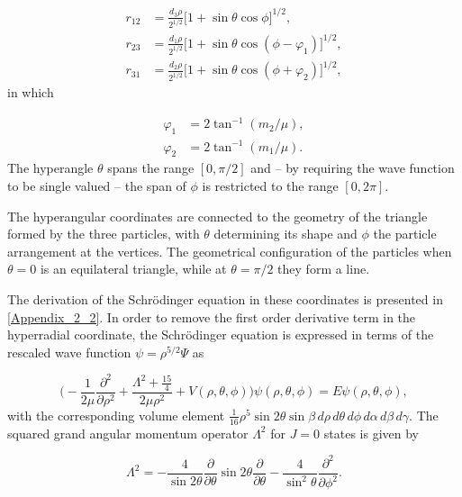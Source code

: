 \begin{equation}
\begin{aligned}
r_{12} &= \frac{d_3\rho}{2^{1/2}}\big[1+\sin\theta\cos\phi\big]^{1/2},\\
r_{23} &= \frac{d_1\rho}{2^{1/2}}\big[1 + \sin\theta\cos(\phi-\varphi_1)\big]^{1/2},\\
r_{31} &= \frac{d_2\rho}{2^{1/2}}\big[1 + \sin\theta\cos(\phi + \varphi_2)\big]^{1/2},
\end{aligned}
\end{equation}
in which

\begin{equation}
\begin{aligned}
\varphi_1 &= 2\tan^{-1}(m_2/\mu),\\
\varphi_2 &= 2\tan^{-1}(m_1/\mu).
\end{aligned}
\end{equation}
The hyperangle $\theta$ spans the range $[0,\pi/2]$ and -- by requiring the wave function to be single valued -- the span of $\phi$ is restricted to the range $[0,2\pi]$. 

The hyperangular coordinates are connected to the geometry of the triangle formed by the three particles, with $\theta$ determining its shape and $\phi$ the particle arrangement at the vertices. The geometrical configuration of the particles when $\theta = 0$ is an equilateral triangle, while at $\theta=\pi/2$ they form a line. 

The derivation of the Schr{\"o}dinger equation in these coordinates is presented in \cref{Appendix_2_2}. In order to remove the first order derivative term in the hyperradial coordinate, the Schr{\"o}dinger equation is expressed in terms of the rescaled wave function $\psi = \rho^{5/2}\Psi$ as

\begin{equation}
 \bigg(-\frac{1}{2 \mu}\frac{\partial^2}{\partial \rho^2} + \frac{ \Lambda^2 + \frac{15}{4}}{2 \mu \rho^{2}}+ V(\rho, \theta, \phi)\bigg)\psi(\rho,\theta,\phi) = E\psi(\rho,\theta,\phi),
\end{equation}
with the corresponding volume element $
\frac{1}{16}\rho^5 \sin 2\theta\sin\beta \,d\rho\,d\theta\,d\phi\, d\alpha\,d\beta\,d\gamma$. The squared grand angular momentum operator $\Lambda^2$ for $J=0$ states is given by

\begin{equation}\label{eq:grandangularmomentum}
\Lambda^2 = -\frac{4}{\sin 2\theta}\frac{\partial}{\partial \theta}\sin 2\theta \frac{\partial}{\partial \theta} - \frac{4}{\sin^2\theta}\frac{\partial^2}{\partial \phi^2}.
\end{equation}

